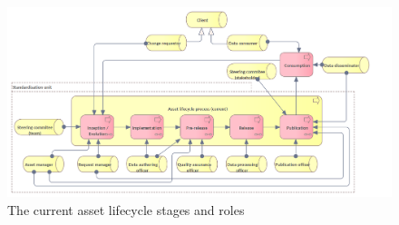 	\begin{figure}[h]
		\centering
		\includegraphics[width=1.05\textwidth]{images/business/Lifecycle (current).png}
		\caption{The current asset lifecycle stages and roles}
		\label{fig:lifecycle-current}
	\end{figure} 
	